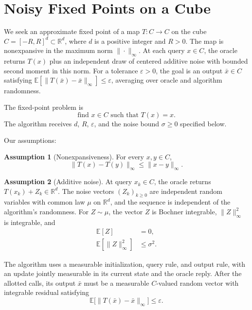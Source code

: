 \documentclass[10pt]{article}
\theoremstyle{definition}
\newtheorem{assumption}{Assumption}
\begin{document}
\section*{Noisy Fixed Points on a Cube}
We seek an approximate fixed point of a map $T:C\to C$ on the cube $C=[-R,R]^d\subset\mathbb{R}^d$, where $d$ is a positive integer and $R>0$. The map is nonexpansive in the maximum norm $\|\cdot\|_\infty$. At each query $x\in C$, the oracle returns $T(x)$ plus an independent draw of centered additive noise with bounded second moment in this norm. For a tolerance $\varepsilon>0$, the goal is an output $\bar{x}\in C$ satisfying $\mathbb{E}[\|T(\bar{x})-\bar{x}\|_\infty]\leq\varepsilon$, averaging over oracle and algorithm randomness.

The fixed-point problem is
\[
\text{find } x\in C \text{ such that } T(x)=x.
\]
The algorithm receives $d$, $R$, $\varepsilon$, and the noise bound $\sigma\geq 0$ specified below.

Our assumptions:
\begin{assumption}[Nonexpansiveness]
For every $x,y\in C$,
\[
\|T(x)-T(y)\|_\infty\leq\|x-y\|_\infty.
\]
\end{assumption}

\begin{assumption}[Additive noise]
At query $x_k\in C$, the oracle returns $T(x_k)+Z_k\in\mathbb{R}^d$. The noise vectors $(Z_k)_{k\geq 0}$ are independent random variables with common law $\mu$ on $\mathbb{R}^d$, and the sequence is independent of the algorithm's randomness. For $Z\sim\mu$, the vector $Z$ is Bochner integrable, $\|Z\|_\infty^2$ is integrable, and
\[
\begin{aligned}
\mathbb{E}[Z]&=0,\\
\mathbb{E}[\|Z\|_\infty^2]&\leq\sigma^2.
\end{aligned}
\]
\end{assumption}

The algorithm uses a measurable initialization, query rule, and output rule, with an update jointly measurable in its current state and the oracle reply. After the allotted calls, its output $\bar{x}$ must be a measurable $C$-valued random vector with integrable residual satisfying
\[
\mathbb{E}\bigl[\|T(\bar{x})-\bar{x}\|_\infty\bigr]\leq\varepsilon.
\]
\end{document}
